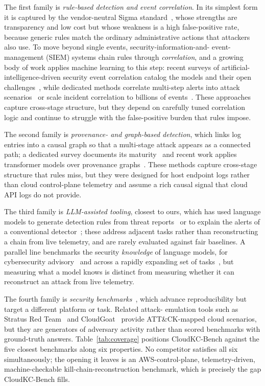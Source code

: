 \documentclass[journal]{IEEEtran}
\begin{document}
The first family is \emph{rule-based detection and event correlation}. In its simplest form it is
captured by the vendor-neutral Sigma standard~\cite{sigma}, whose strengths are transparency and low
cost but whose weakness is a high false-positive rate, because generic rules match the ordinary
administrative actions that attackers also use. To move beyond single events, security-information-and-
event-management (SIEM) systems chain rules through \emph{correlation}, and a growing body of work
applies machine learning to this step: recent surveys of artificial-intelligence-driven security event
correlation catalog the models and their open challenges~\cite{aisecevent22}, while dedicated methods
correlate multi-step alerts into attack scenarios~\cite{maac} or scale incident correlation to billions
of events~\cite{graphweaver}. These approaches capture cross-stage structure, but they depend on
carefully tuned correlation logic and continue to struggle with the false-positive burden that rules
impose.

The second family is \emph{provenance- and graph-based detection}, which links log entries into a
causal graph so that a multi-stage attack appears as a connected path; a dedicated survey documents its
maturity~\cite{provsurvey} and recent work applies transformer models over provenance
graphs~\cite{tbdetector}. These methods capture cross-stage structure that rules miss, but they were
designed for host endpoint logs rather than cloud control-plane telemetry and assume a rich causal
signal that cloud API logs do not provide.

The third family is \emph{LLM-assisted tooling}, closest to ours, which has used language models to
generate detection rules from threat reports~\cite{llmcloudhunter} or to explain the alerts of a
conventional detector~\cite{huntgpt}; these address adjacent tasks rather than reconstructing a chain
from live telemetry, and are rarely evaluated against fair baselines. A parallel line benchmarks the
security \emph{knowledge} of language models, for cybersecurity advisory~\cite{secure_bench} and across
a rapidly expanding set of tasks~\cite{llmbenchsurvey}, but measuring what a model knows is distinct
from measuring whether it can reconstruct an attack from live telemetry.

The fourth family is \emph{security benchmarks}~\cite{cybersoceval, excytin, orgforge, acseeval,
mukherjee}, which advance reproducibility but target a different platform or task. Related attack-
emulation tools such as Stratus Red Team~\cite{stratus} and CloudGoat~\cite{cloudgoat} provide
ATT\&CK-mapped cloud scenarios, but they are generators of adversary activity rather than scored
benchmarks with ground-truth answers. Table~\ref{tab:coverage} positions CloudKC-Bench against the five
closest benchmarks along six properties. No competitor satisfies all six simultaneously; the opening it
leaves is an AWS-control-plane, telemetry-driven, machine-checkable kill-chain-reconstruction
benchmark, which is precisely the gap CloudKC-Bench fills.
\end{document}
